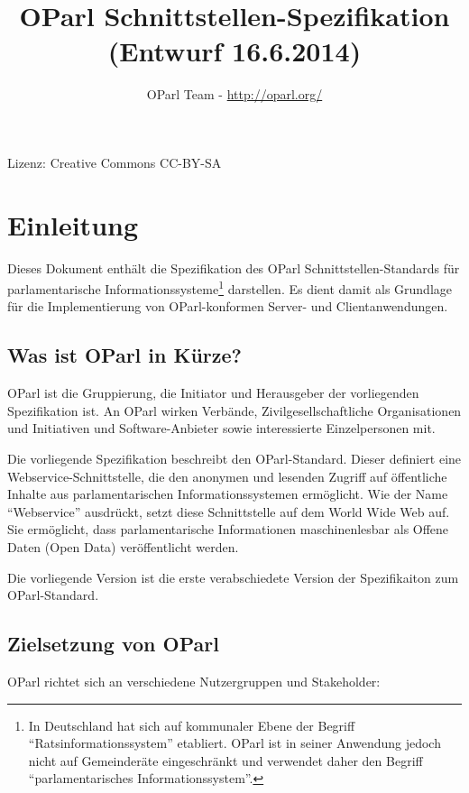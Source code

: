 \documentclass[,a4paper]{article}
\title{OParl Schnittstellen-Spezifikation (Entwurf 16.6.2014)}
\author{OParl Team - \url{http://oparl.org/}}
\date{}
\begin{document}
\maketitle

Lizenz: Creative Commons CC-BY-SA

\section{Einleitung}\label{einleitung}

Dieses Dokument enthält die Spezifikation des OParl
Schnittstellen-Standards für parlamentarische
Informationssysteme\footnote{In Deutschland hat sich auf kommunaler
  Ebene der Begriff ``Ratsinformationssystem'' etabliert. OParl ist in
  seiner Anwendung jedoch nicht auf Gemeinderäte eingeschränkt und
  verwendet daher den Begriff ``parlamentarisches Informationssystem''.}
darstellen. Es dient damit als Grundlage für die Implementierung von
OParl-konformen Server- und Clientanwendungen.

\subsection{Was ist OParl in Kürze?}\label{was-ist-oparl-in-kuxfcrze}

OParl ist die Gruppierung, die Initiator und Herausgeber der
vorliegenden Spezifikation ist. An OParl wirken Verbände,
Zivilgesellschaftliche Organisationen und Initiativen und
Software-Anbieter sowie interessierte Einzelpersonen mit.

Die vorliegende Spezifikation beschreibt den OParl-Standard. Dieser
definiert eine Webservice-Schnittstelle, die den anonymen und lesenden
Zugriff auf öffentliche Inhalte aus parlamentarischen
Informationssystemen ermöglicht. Wie der Name ``Webservice'' ausdrückt,
setzt diese Schnittstelle auf dem World Wide Web auf. Sie ermöglicht,
dass parlamentarische Informationen maschinenlesbar als Offene Daten
(Open Data) veröffentlicht werden.

Die vorliegende Version ist die erste verabschiedete Version der
Spezifikaiton zum OParl-Standard.

\subsection{Zielsetzung von OParl}\label{zielsetzung-von-oparl}

OParl richtet sich an verschiedene Nutzergruppen und Stakeholder:
\end{document}
